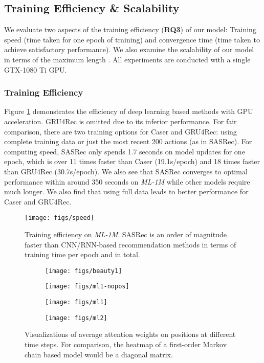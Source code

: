\documentclass[conference]{IEEEtran}
\newcommand{\xhdr}[1]{\subsubsection*{\bf #1}}
\begin{document}
\subsection{Training Efficiency \& Scalability}

We evaluate two aspects of the training efficiency (\textbf{RQ3}) of our model: 
Training speed (time taken for one epoch of training) and convergence time (time taken to achieve satisfactory performance). 
We also 
examine
the scalability of our model in terms of the maximum length . All experiments are conducted with a single GTX-1080 Ti GPU.


\xhdr{Training Efficiency} Figure \ref{fig:speed} demonstrates the efficiency of deep learning based methods with GPU acceleration. GRU4Rec is omitted due to its 
inferior
performance. For fair comparison, there are two training options for Caser and GRU4Rec: using 
complete
training data or just the most recent 200 actions (as in SASRec). 
For computing speed, SASRec only spends 1.7 seconds on model 
updates
for one epoch, which is over 11 times faster than Caser (19.1s/epoch) and 18 times faster than GRU4Rec (30.7s/epoch). 
We also see that
SASRec 
converges to optimal 
performance within around 350 seconds on \emph{ML-1M} while other models require much 
longer.
We also find that
using full data 
leads to better
performance for Caser and GRU4Rec.

\begin{figure}[h]
\centering
\texttt{[image: figs/speed]}
\caption{Training efficiency on \emph{ML-1M}. 
SASRec is an order of magnitude faster than CNN/RNN-based recommendation methods in terms of training time per epoch and in total.}
\label{fig:speed}
\end{figure}


\begin{figure*}
\centering
\begin{subfigure}[b]{0.245\textwidth}
\texttt{[image: figs/beauty1]}
\end{subfigure}
\begin{subfigure}[b]{0.245\textwidth}
\texttt{[image: figs/ml1-nopos]}
\end{subfigure}
\begin{subfigure}[b]{0.245\textwidth}
\texttt{[image: figs/ml1]}
\end{subfigure}
\begin{subfigure}[b]{0.245\textwidth}
\texttt{[image: figs/ml2]}
\end{subfigure}
\caption{Visualizations of average attention weights on positions at different time steps. For comparison, the heatmap of a first-order Markov chain based model would be a diagonal matrix.}
\label{fig:vis_pos}
\end{figure*}  
\end{document}
